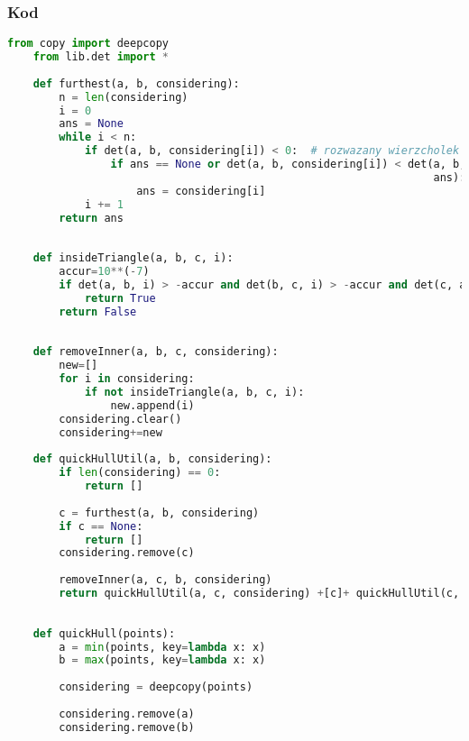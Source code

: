 \documentclass[11pt]{article}
\theoremstyle{remark} \newtheorem{definition}{def.}
\theoremstyle{definition} \newtheorem{twierdzenie}{tw.}
\begin{document}
    \subsubsection{Kod}
\begin{lstlisting}[language=Python]
    from copy import deepcopy
    from lib.det import *
    
    def furthest(a, b, considering):
        n = len(considering)
        i = 0
        ans = None
        while i < n:
            if det(a, b, considering[i]) < 0:  # rozwazany wierzcholek jest po prawej stronie ab
                if ans == None or det(a, b, considering[i]) < det(a, b,
                                                                  ans):  # |det(a,b,c)| = 1/2|ab|*h, gdzie h jest wysokoscia z c na ab
                    ans = considering[i]
            i += 1
        return ans
    
    
    def insideTriangle(a, b, c, i):
        accur=10**(-7)
        if det(a, b, i) > -accur and det(b, c, i) > -accur and det(c, a, i) > -accur:
            return True
        return False
    
    
    def removeInner(a, b, c, considering):
        new=[]
        for i in considering:
            if not insideTriangle(a, b, c, i):
                new.append(i)
        considering.clear()
        considering+=new
    
    def quickHullUtil(a, b, considering):
        if len(considering) == 0:
            return []
    
        c = furthest(a, b, considering)
        if c == None:
            return []
        considering.remove(c)
    
        removeInner(a, c, b, considering)
        return quickHullUtil(a, c, considering) +[c]+ quickHullUtil(c, b, considering)
    
    
    def quickHull(points):
        a = min(points, key=lambda x: x)
        b = max(points, key=lambda x: x)
    
        considering = deepcopy(points)
    
        considering.remove(a)
        considering.remove(b)
\end{lstlisting}

    \medskip

\end{document}
